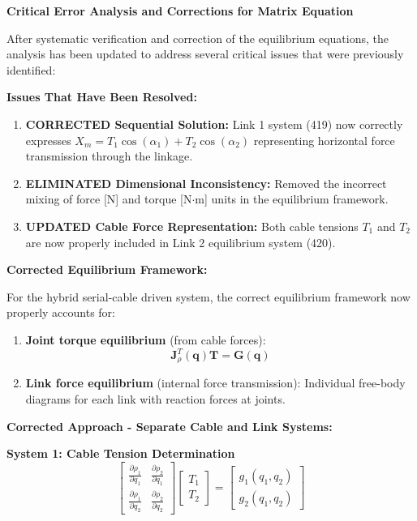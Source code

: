 \textbf{Critical Error Analysis and Corrections for Matrix Equation}

After systematic verification and correction of the equilibrium equations, the analysis has been updated to address several critical issues that were previously identified:

\textbf{Issues That Have Been Resolved:}

\begin{enumerate}
    \item \textbf{CORRECTED Sequential Solution:} Link 1 system (419) now correctly expresses $X_m = T_1 \cos(\alpha_1) + T_2 \cos(\alpha_2)$ representing horizontal force transmission through the linkage.
    
    \item \textbf{ELIMINATED Dimensional Inconsistency:} Removed the incorrect mixing of force [N] and torque [N$\cdot$m] units in the equilibrium framework.
    
    \item \textbf{UPDATED Cable Force Representation:} Both cable tensions $T_1$ and $T_2$ are now properly included in Link 2 equilibrium system (420).
\end{enumerate}

\textbf{Corrected Equilibrium Framework:}

For the hybrid serial-cable driven system, the correct equilibrium framework now properly accounts for:

\begin{enumerate}
    \item \textbf{Joint torque equilibrium} (from cable forces):
    $$\mathbf{J}_{\rho}^T(\mathbf{q}) \mathbf{T} = \mathbf{G}(\mathbf{q})$$
    
    \item \textbf{Link force equilibrium} (internal force transmission):
    Individual free-body diagrams for each link with reaction forces at joints.
\end{enumerate}

\textbf{Corrected Approach - Separate Cable and Link Systems:}

\textbf{System 1: Cable Tension Determination}
$$\begin{bmatrix} 
\frac{\partial \rho_1}{\partial q_1} & \frac{\partial \rho_2}{\partial q_1} \\
\frac{\partial \rho_1}{\partial q_2} & \frac{\partial \rho_2}{\partial q_2}
\end{bmatrix} 
\begin{bmatrix} T_1 \\ T_2 \end{bmatrix} = 
\begin{bmatrix} g_1(q_1, q_2) \\ g_2(q_1, q_2) \end{bmatrix}$$

